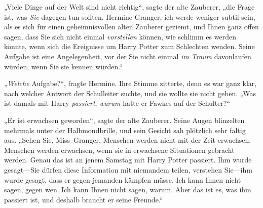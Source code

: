 „Viele Dinge auf der Welt sind nicht richtig“, sagte der alte Zauberer, „die Frage ist, was \emph{Sie} dagegen tun sollten. Hermine Granger, ich werde weniger subtil sein, als es sich für einen geheimnisvollen alten Zauberer geziemt, und Ihnen ganz offen sagen, dass Sie sich nicht einmal \emph{vorstellen} können, wie schlimm es werden könnte, wenn sich die Ereignisse um Harry Potter zum Schlechten wenden. Seine Aufgabe ist eine Angelegenheit, vor der Sie nicht einmal \emph{im Traum} davonlaufen würden, wenn Sie sie kennen würden.“

„\emph{Welche} Aufgabe?“, fragte Hermine. Ihre Stimme zitterte, denn es war ganz klar, nach welcher Antwort der Schulleiter suchte, und sie wollte sie nicht geben. „Was ist damals mit Harry \emph{passiert}, \emph{warum} hatte er Fawkes auf der Schulter?“

„Er ist erwachsen geworden“, sagte der alte Zauberer. Seine Augen blinzelten mehrmals unter der Halbmondbrille, und sein Gesicht sah plötzlich sehr faltig aus. „Sehen Sie, Miss~Granger, Menschen werden nicht mit der Zeit erwachsen, Menschen werden erwachsen, wenn sie in erwachsene Situationen gebracht werden. Genau das ist an jenem Samstag mit Harry Potter passiert. Ihm wurde gesagt—Sie dürfen diese Information mit niemandem teilen, verstehen Sie—ihm wurde gesagt, dass er gegen jemanden kämpfen müsse. Ich kann Ihnen nicht sagen, gegen wen. Ich kann Ihnen nicht sagen, warum. Aber das ist es, was ihm passiert ist, und deshalb braucht er seine Freunde.“

